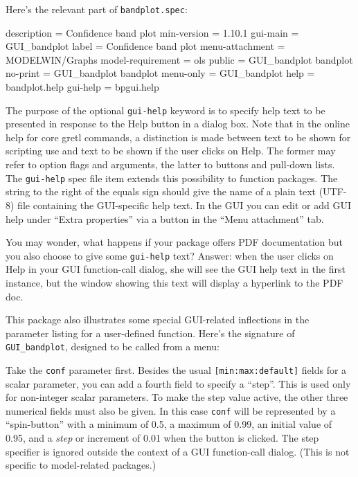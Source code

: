 \documentclass[oneside]{book}
\begin{document}
Here's the relevant part of \texttt{bandplot.spec}:

\begin{code}
description = Confidence band plot
min-version = 1.10.1
gui-main = GUI_bandplot
label = Confidence band plot
menu-attachment = MODELWIN/Graphs
model-requirement = ols
public = GUI_bandplot bandplot
no-print = GUI_bandplot bandplot
menu-only = GUI_bandplot
help = bandplot.help
gui-help = bpgui.help
\end{code}

The purpose of the optional \texttt{gui-help} keyword is to specify
help text to be presented in response to the \textsf{Help} button in a
dialog box. Note that in the online help for core gretl commands, a
distinction is made between text to be shown for scripting use and
text to be shown if the user clicks on \textsf{Help}. The former may
refer to option flags and arguments, the latter to buttons and
pull-down lists. The \texttt{gui-help} spec file item extends this
possibility to function packages. The string to the right of the
equals sign should give the name of a plain text (UTF-8) file
containing the GUI-specific help text. In the GUI you can edit or add
GUI help under ``Extra properties'' via a button in the ``Menu
attachment'' tab.

You may wonder, what happens if your package offers PDF documentation
but you also choose to give some \texttt{gui-help} text? Answer: when
the user clicks on \textsf{Help} in your GUI function-call dialog, she
will see the GUI help text in the first instance, but the window
showing this text will display a hyperlink to the PDF doc.

This package also illustrates some special GUI-related inflections in
the parameter listing for a user-defined function. Here's the
signature of \texttt{GUI\_bandplot}, designed to be called from a
menu:
%
Take the \texttt{conf} parameter first. Besides the usual
\texttt{[min:max:default]} fields for a scalar parameter, you can add
a fourth field to specify a ``step''. This is used only for
non-integer scalar parameters. To make the step value active, the
other three numerical fields must also be given.  In this case
\texttt{conf} will be represented by a ``spin-button'' with a minimum
of 0.5, a maximum of 0.99, an initial value of 0.95, and a
\textit{step} or increment of 0.01 when the button is clicked. The
step specifier is ignored outside the context of a GUI function-call
dialog. (This is not specific to model-related packages.)
\end{document}
